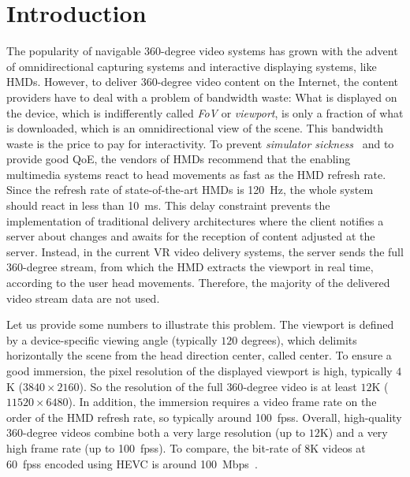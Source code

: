 \section{Introduction}
\label{sec:introduction}

The popularity of navigable 360-degree video systems has grown with
the advent of omnidirectional capturing systems
and interactive displaying systems, like \acp{HMD}. However, to
deliver 360-degree video content on the Internet, the content
providers have to deal with a problem of bandwidth waste: What is
displayed on the device, which is indifferently called
\textit{\ac{FoV}} or \textit{viewport}, is only a fraction of what is
downloaded, which is an omnidirectional view of the scene.
This bandwidth waste is the price to pay for interactivity. To prevent
\emph{simulator sickness}~\cite{moss2011characteristics} and to
provide good \ac{QoE}, the vendors of \acp{HMD} recommend that the
enabling multimedia systems react to head movements as fast as the
\ac{HMD} refresh rate.
Since the refresh rate of state-of-the-art \acp{HMD} is
\SI{120}{\hertz},
the whole
system should react in less than \SI{10}{ms}. This delay constraint
prevents the implementation of traditional delivery architectures
where the client notifies a server about changes and awaits for the
reception of content adjusted at the server. Instead, in the current
\ac{VR} video delivery systems, the server sends the full $360$-degree
stream, from which the \ac{HMD} extracts the viewport in real time,
according to the user head movements. Therefore, the majority of the
delivered video stream data are not used.

Let us provide some numbers to illustrate this problem. The viewport
is defined by a device-specific viewing angle (typically
$120$ degrees), which delimits horizontally the scene from the head direction center, called \FoV{} center. To ensure a
good immersion, the pixel resolution of the displayed viewport is high,
typically $4$K ($3840\times2160$). So the
resolution of the full $360$-degree video is at least $12$K
($11520\times6480$). In addition, the immersion requires a video frame
rate on the order of the \ac{HMD} refresh rate, so typically around
\SI[mode=text]{100}{\acp{fps}}. Overall, high-quality $360$-degree
videos combine both a very large resolution (up to $12$K) and a very
high frame rate (up to \SI[mode=text]{100}{\acp{fps}}). To compare,
the bit-rate of 8K videos at \SI[mode=text]{60}{\acp{fps}} encoded
using \ac{HEVC} is around \SI{100}{Mbps}~\cite{7398367}.


